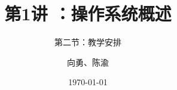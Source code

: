 \documentclass[UTF8]{ctexbeamer}
\title[第1讲]{第1讲 ：操作系统概述} %
\subtitle{第二节：教学安排}
\author{向勇、陈渝} %
\institute[清华大学] %
{
清华大学计算机系 \\ %
\medskip
\textit{xyong,yuchen@tsinghua.edu.cn} %
}
\date{\today} %
\begin{document}
\begin{frame}
\titlepage %
\end{frame}

%
%
\end{document}

